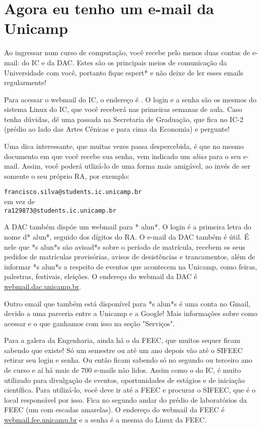 
\section{Agora eu tenho um e-mail da Unicamp}

Ao ingressar num curso de computação, você recebe pelo menos duas contas de
e-mail: do IC e da DAC. Estes são os principais meios de comunicação da
Universidade com você, portanto fique espert* e não deixe de ler esses emails
regularmente!

Para acessar o webmail do IC, o endereço é
.  O login e a senha são os
mesmos do sistema Linux do IC, que você receberá nas primeiras semanas de
aula. Caso tenha dúvidas, dê uma passada na Secretaria de Graduação, que fica no
IC-2 (prédio ao lado das Artes Cênicas e para cima da Economia) e pergunte!

Uma dica interessante, que muitas vezes passa despercebida, é que no mesmo
documento em que você recebe sua senha, vem indicado um {\it alias} para o seu
e-mail. Assim, você poderá utlizá-lo de uma forma mais amigável, ao invés de ser
somente o seu próprio RA, por exemplo:

\begin{center}
\texttt{francisco.silva@students.ic.unicamp.br}\\
em vez de\\
\texttt{ra129873@students.ic.unicamp.br}
\end{center}

A DAC também dispõe um webmail para * alun*. O login é a primeira letra do nome
d* alun*, seguido dos dígitos do RA. O e-mail da DAC também é útil. É nele que
*s alun*s são avisad*s sobre o período de matrícula, recebem os seus pedidos de
matrículas provisórias, avisos de desistências e trancamentos, além de informar
*s alun*s a respeito de eventos que acontecem na Unicamp, como feiras,
palestras, festivais, eleições. O endereço do webmail da DAC é
\url{webmail.dac.unicamp.br}.

Outro email que também está disponível para *s alun*s é uma conta no Gmail,
devido a uma parceria entre a Unicamp e a Google! Mais informações sobre como
acessar e o que ganhamos com isso na seção "Serviços".

Para a galera da Engenharia, ainda há o da FEEC, que muitos sequer ficam
sabendo que existe! Só um semestre ou até um ano depois vão até o SIFEEC retirar
seu login e senha. Ou então ficam sabendo só no segundo ou terceiro ano de curso
e aí há mais de 700 e-mails não lidos. Assim como o do IC, é muito utilizado
para divulgação de eventos, oportunidades de estágios e de iniciação científica.
Para utilizá-lo, você deve ir até a FEEC e procurar o SIFEEC, que é o local
responsável por isso. Fica no segundo andar do prédio de laboratórios da FEEC
(um com escadas amarelas). O endereço do webmail da FEEC é
\url{webmail.fee.unicamp.br} e a senha é a mesma do Linux da FEEC.

